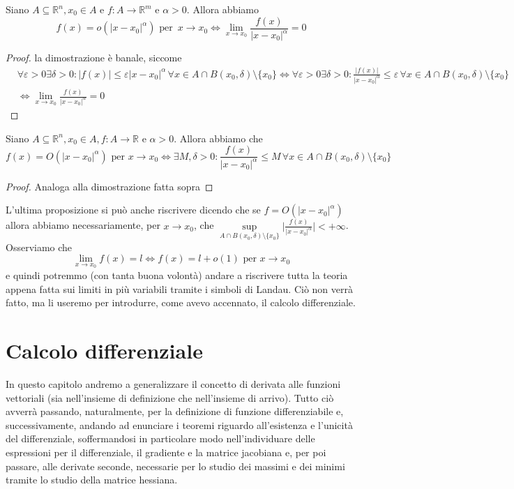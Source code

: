 \documentclass[openany, italian]{book}
\begin{document}
\begin{prop}
Siano $A \subseteq \mathbb{R}^n, x_0 \in  A$ e $f: A \to \mathbb{R}^m$ e $\alpha > 0$. Allora abbiamo
$$
f(x) = o(|x-x_0|^\alpha) \text{ per } \, x \to x_0 \iff \lim_{x \to x_0} \frac{f(x)}{|x-x_0|^\alpha} = 0
$$
\end{prop}
\begin{proof}
la dimostrazione è banale, siccome 
\begin{align*}
&\forall \varepsilon > 0 \exists \delta > 0: |f(x)| \leq \varepsilon |x-x_0|^\alpha \, \forall x \in A \cap B(x_0, \delta) \setminus \{ x_0 \} \iff \forall \varepsilon > 0 \exists \delta > 0: \frac{|f(x)|}{|x-x_0|^\alpha} \leq \varepsilon \, \forall x \in A \cap B(x_0, \delta) \setminus \{ x_0 \} \\ &\iff \lim_{x \to x_0} \frac{f(x)}{|x-x_0|^\alpha} = 0
\end{align*}
\end{proof}
\begin{prop}
Siano $A \subseteq \mathbb{R}^n, x_0 \in A, f: A \to \mathbb{R}$ e $\alpha > 0$. Allora abbiamo che $$f(x) = O(|x-x_0|^\alpha) \text{ per } x \to x_0 \iff \exists M, \delta > 0: \frac{f(x)}{|x-x_0|^\alpha} \leq M \, \forall x \in A \cap B(x_0, \delta) \setminus \{ x_0 \}$$
\end{prop}
\begin{proof}
Analoga alla dimostrazione fatta sopra
\end{proof}
\noindent L'ultima proposizione si può anche riscrivere dicendo che se $f=O(|x-x_0|^\alpha)$ allora abbiamo necessariamente, per $x \to x_0$, che $\sup\limits_{A \cap B(x_0, \delta) \setminus \{ x_0 \}} \Bigg| \frac{f(x)}{|x-x_0|^{\alpha}} \Bigg| < +\infty$. \\
Osserviamo che
$$
\lim_{x \to x_0} f(x) = l \iff f(x) = l + o(1) \text{ per } x \to x_0
$$
e quindi potremmo (con tanta buona volontà) andare a riscrivere tutta la teoria appena fatta sui limiti in più variabili tramite i simboli di Landau. Ciò non verrà fatto, ma li useremo per introdurre, come avevo accennato, il calcolo differenziale.

\chapter{Calcolo differenziale}

In questo capitolo andremo a generalizzare il concetto di derivata  alle funzioni vettoriali (sia nell'insieme di definizione che nell'insieme di arrivo). Tutto ciò avverrà passando, naturalmente, per la definizione di funzione differenziabile e, successivamente, andando ad enunciare i teoremi riguardo all'esistenza e l'unicità del differenziale, soffermandosi in particolare modo nell'individuare delle espressioni per il differenziale, il gradiente e la matrice jacobiana e, per poi passare, alle derivate seconde, necessarie per lo studio dei massimi e dei minimi tramite lo studio della matrice hessiana. 
\end{document}
